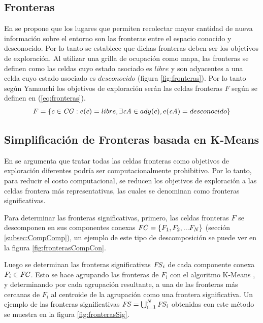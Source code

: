 \subsection{Fronteras}\label{subsec:todasFront}
En \cite{yamauchi1998frontier} se propone que los lugares que permiten
recolectar mayor cantidad de nueva información sobre el entorno son las
fronteras entre el espacio conocido y desconocido. Por lo tanto se establece que dichas
fronteras deben ser los objetivos de exploración.
Al utilizar una grilla de ocupación como mapa, las fronteras se definen como las
celdas cuyo estado asociado es $libre$ y son adyacentes a una celda cuyo estado
asociado es $desconocido$ (figura \ref{fig:fronteras}).
Por lo tanto según Yamauchi los objetivos de exploración serán las celdas
fronteras $F$ según se definen en (\ref{eq:fronteras}).
\begin{equation} 
  F = \{ c \in \mathit{CG} : e(c) = libre, \exists \mathit{cA} \in ady(c), e(\mathit{cA}) = desconocido  \}
  \label{eq:fronteras}
\end{equation}

\subsection{Simplificación de Fronteras basada en K-Means}\label{subsec:simpKM}
En \cite{Amorin2019} se argumenta que tratar todas las celdas fronteras como
objetivos de exploración diferentes podría ser computacionalmente prohibitivo.
Por lo tanto, para reducir el costo computacional, se reducen los objetivos de
exploración a las celdas frontera más representativas, las cuales se
denominan como fronteras significativas.

Para determinar las fronteras significativas, primero, las celdas fronteras $F$
se descomponen en sus componentes conexas $\mathit{FC}=\{F_1,F_2,...F_N\}$
(sección \ref{subsec:CompComp}), un ejemplo de este tipo de descomposición se
puede ver en la figura \ref{fig:fronterasCompCon}.

Luego se determinan las fronteras significativas $\mathit{FS}_i$ de cada
componente conexa $F_i\in \mathit{FC}$. Esto se hace agrupando las fronteras de
$F_i$ con el algoritmo K-Means \cite{macqueen1967some}, y determinando por cada
agrupación resultante, a una de las fronteras más cercanas de $F_i$ al
centroide de la agrupación como una frontera significativa. Un ejemplo de
las fronteras significativas $\mathit{FS} = \bigcup_{i=1}^N \mathit{FS_i}$ obtenidas
con este método se muestra en la figura \ref{fig:fronterasSig}.

